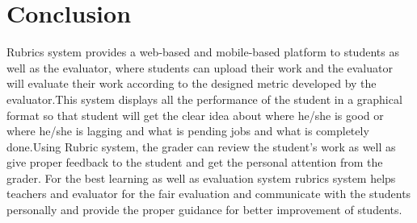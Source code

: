 \chapter{Conclusion }

Rubrics system provides a web-based and mobile-based platform to students as well as the evaluator, where students can upload their work and the evaluator will evaluate their work according to the designed metric developed by the evaluator.This system displays all the performance of the student in a graphical format so that student will get the clear idea about where he/she is good or where he/she is lagging and what is pending jobs and what is completely done.Using Rubric system, the grader can review the student's work as well as give proper feedback to the student and get the personal attention from the grader.
For the best learning as well as evaluation system rubrics system helps teachers and evaluator for the fair evaluation  and communicate with the students personally and provide the proper guidance for better improvement of students.